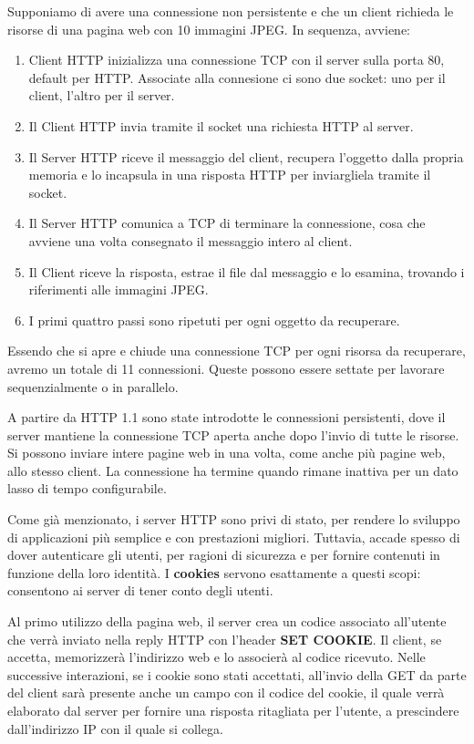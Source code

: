 Supponiamo di avere una connessione non persistente e che un client richieda le risorse di una pagina web con 10 immagini JPEG. In sequenza, avviene: \begin{enumerate}
	\item Client HTTP inizializza una connessione TCP con il server sulla porta 80, default per HTTP. Associate alla connesione ci sono due socket: uno per il client, l'altro per il server.
	\item Il Client HTTP invia tramite il socket una richiesta HTTP al server.
	\item Il Server HTTP riceve il messaggio del client, recupera l'oggetto dalla propria memoria e lo incapsula in una risposta HTTP per inviargliela tramite il socket.
	\item Il Server HTTP comunica a TCP di terminare la connessione, cosa che avviene una volta consegnato il messaggio intero al client.
	\item Il Client riceve la risposta, estrae il file dal messaggio e lo esamina, trovando i riferimenti alle immagini JPEG.
	\item I primi quattro passi sono ripetuti per ogni oggetto da recuperare.
\end{enumerate}
\noindent Essendo che si apre e chiude una connessione TCP per ogni risorsa da recuperare, avremo un totale di 11 connessioni. Queste possono essere settate per lavorare sequenzialmente o in parallelo.\par
A partire da HTTP 1.1 sono state introdotte le connessioni persistenti, dove il server mantiene la connessione TCP aperta anche dopo l'invio di tutte le risorse. Si possono inviare intere pagine web in una volta, come anche più pagine web, allo stesso client. La connessione ha termine quando rimane inattiva per un dato lasso di tempo configurabile.\newline

\noindent Come già menzionato, i server HTTP sono privi di stato, per rendere lo sviluppo di applicazioni più semplice e con prestazioni migliori. Tuttavia, accade spesso di dover autenticare gli utenti, per ragioni di sicurezza e per fornire contenuti in funzione della loro identità. I \textbf{cookies} servono esattamente a questi scopi: consentono ai server di tener conto degli utenti.\par
Al primo utilizzo della pagina web, il server crea un codice associato all'utente che verrà inviato nella reply HTTP con l'header \textbf{SET COOKIE}. Il client, se accetta, memorizzerà l'indirizzo web e lo associerà al codice ricevuto. Nelle successive interazioni, se i cookie sono stati accettati, all'invio della GET da parte del client sarà presente anche un campo con il codice del cookie, il quale verrà elaborato dal server per fornire una risposta ritagliata per l'utente, a prescindere dall'indirizzo IP con il quale si collega.\newline

